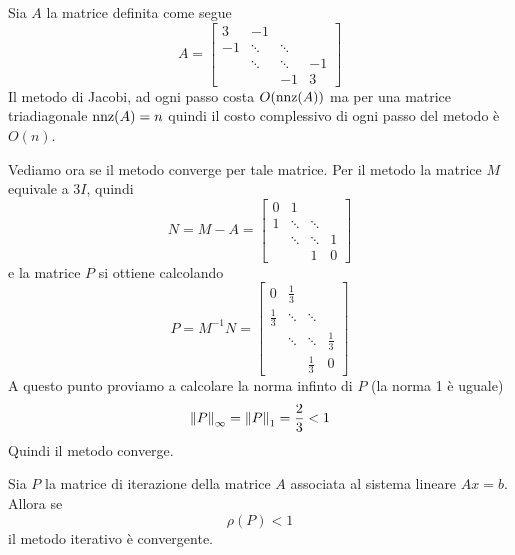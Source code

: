 \begin{example}
	Sia $A$ la matrice definita come segue
	\[
		A = \begin{bmatrix}
			3  & -1     &        &    \\
			-1 & \ddots & \ddots &    \\
			   & \ddots & \ddots & -1 \\
			   &        & -1     & 3
		\end{bmatrix}
	\]
	Il metodo di Jacobi, ad ogni passo costa $O(\operatorname{nnz}(A))$ ma per una matrice triadiagonale $\operatorname{nnz}(A) = n$ quindi
	il costo complessivo di ogni passo del metodo è $O(n)$.

	Vediamo ora se il metodo converge per tale matrice. Per il metodo la matrice $M$ equivale a $3I$, quindi
	\[
		N = M - A = \begin{bmatrix}
			0 & 1      &        &   \\
			1 & \ddots & \ddots &   \\
			  & \ddots & \ddots & 1 \\
			  &        & 1      & 0
		\end{bmatrix}
	\]
	e la matrice $P$ si ottiene calcolando
	\[
		P = M^{-1} N = \begin{bmatrix}
			0           & \frac{1}{3} &             &             \\
			\frac{1}{3} & \ddots      & \ddots      &             \\
			            & \ddots      & \ddots      & \frac{1}{3} \\
			            &             & \frac{1}{3} & 0
		\end{bmatrix}
	\]
	A questo punto proviamo a calcolare la norma infinto di $P$ (la norma 1 è uguale)
	\[ \left\lVert P\right\rVert_\infty = \left\lVert P\right\rVert_1 = \frac{2}{3} < 1 \]
	Quindi il metodo converge.
\end{example}

\begin{theorem}\label{th: convergenza_spettrale}
	Sia $P$ la matrice di iterazione della matrice $A$ associata al sistema lineare $Ax = b$. Allora se
	\[ \rho (P) < 1 \]
	il metodo iterativo è convergente.
\end{theorem}

